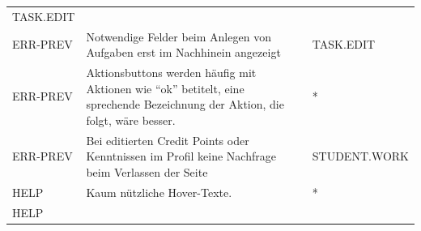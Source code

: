 \documentclass[
  12pt,
  ngerman,
  a4paper,
]{article}
\begin{document}
\begin{longtable}[]{@{}lll@{}}
\begin{minipage}[t]{0.17\columnwidth}
TASK.EDIT\strut
\end{minipage}\tabularnewline
\begin{minipage}[t]{0.22\columnwidth}\raggedright
ERR-PREV\strut
\end{minipage} & \begin{minipage}[t]{0.52\columnwidth}\raggedright
Notwendige Felder beim Anlegen von Aufgaben erst im Nachhinein
angezeigt\strut
\end{minipage} & \begin{minipage}[t]{0.17\columnwidth}\raggedright
TASK.EDIT\strut
\end{minipage}\tabularnewline
\begin{minipage}[t]{0.22\columnwidth}\raggedright
ERR-PREV\strut
\end{minipage} & \begin{minipage}[t]{0.52\columnwidth}\raggedright
Aktionsbuttons werden häufig mit Aktionen wie ``ok'' betitelt, eine
sprechende Bezeichnung der Aktion, die folgt, wäre besser.\strut
\end{minipage} & \begin{minipage}[t]{0.17\columnwidth}\raggedright
*\strut
\end{minipage}\tabularnewline
\begin{minipage}[t]{0.22\columnwidth}\raggedright
ERR-PREV\strut
\end{minipage} & \begin{minipage}[t]{0.52\columnwidth}\raggedright
Bei editierten Credit Points oder Kenntnissen im Profil keine Nachfrage
beim Verlassen der Seite\strut
\end{minipage} & \begin{minipage}[t]{0.17\columnwidth}\raggedright
STUDENT.WORK\strut
\end{minipage}\tabularnewline
\begin{minipage}[t]{0.22\columnwidth}\raggedright
HELP\strut
\end{minipage} & \begin{minipage}[t]{0.52\columnwidth}\raggedright
Kaum nützliche Hover-Texte.\strut
\end{minipage} & \begin{minipage}[t]{0.17\columnwidth}\raggedright
*\strut
\end{minipage}\tabularnewline
\begin{minipage}[t]{0.22\columnwidth}\raggedright
HELP\strut
\end{minipage} & \begin{minipage}[t]{0.52\columnwidth}\raggedright

\end{minipage}
\end{longtable}
\end{document}
